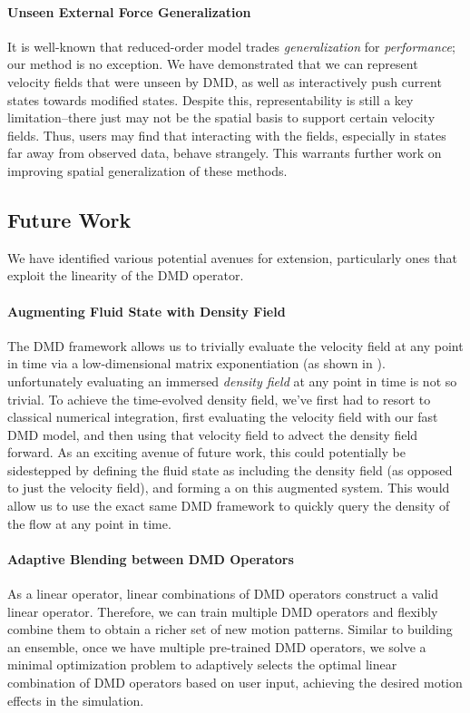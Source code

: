 \paragraph{Unseen External Force Generalization} It is well-known that reduced-order model trades \emph{generalization} for \emph{performance}; our method is no exception. We have demonstrated that we can represent velocity fields that were unseen by DMD, as well as interactively push current states towards modified states. Despite this, representability is still a key limitation--there just may not be the spatial basis to support certain velocity fields. Thus, users may find that interacting with the fields, especially in states far away from observed data, behave strangely. This warrants further work on improving spatial generalization of these methods.



\subsection{Future Work}
\label{sec:future_works}
We have identified various potential avenues for extension, particularly ones that exploit the linearity of the DMD operator.

\paragraph{Augmenting Fluid State with Density Field}
The DMD framework allows us to trivially evaluate the velocity field at any point in time via a low-dimensional matrix exponentiation (as shown in ).
%
unfortunately evaluating an immersed  \textit{density field } at any point in 
time is not so trivial.
%
To achieve the time-evolved density field, we've first had to resort to classical numerical integration, first evaluating the velocity field with our fast DMD model, and then using that velocity field to advect the density field forward.
As an exciting avenue of future work, this could potentially be sidestepped by defining the fluid state as including the density field (as opposed to just the velocity field), and forming a \koopman{} on this augmented system. This would allow us to use the exact same DMD framework to quickly query the density of the flow at any point in time.

\paragraph{Adaptive Blending between DMD Operators}
As a linear operator, linear combinations of DMD operators construct a valid linear operator. Therefore, we can train multiple DMD operators and flexibly combine them to obtain a richer set of new motion patterns.
Similar to building an ensemble, once we have multiple pre-trained DMD operators, we solve a minimal optimization problem to adaptively selects the optimal linear combination of DMD operators based on user input, achieving the desired motion effects in the simulation.
